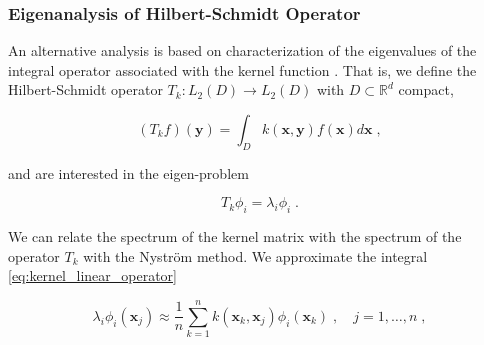 \documentclass{article}
\newcommand{\vect}[1]{\boldsymbol{\mathbf{#1}}}
\newcommand{\R}{\mathbb R}
\DeclareMathOperator{\E}{\mathbb{E}}
\newtheorem{lemma}[theorem]{Lemma}
\begin{document}

\subsubsection{Eigenanalysis of Hilbert-Schmidt Operator} 

An alternative analysis is based on characterization of the eigenvalues of the integral operator associated with the kernel function \cite{banerjee_parallel_2013, pan_learning_2011, bach_kernel_2002}. That is, we define the Hilbert-Schmidt operator $T_k : L_2(D) \to L_2(D)$ with $D \subset \R^d$ compact,

\begin{equation} \label{eq:kernel_linear_operator}
    (T_k f)(\vect y) = \int_{D} k(\vect x, \vect y) f(\vect x)  d\vect x  \; ,%
\end{equation}

and are interested in the eigen-problem

\begin{equation*}
    T_k \phi_i = \lambda_i \phi_i \; .
\end{equation*}

We can relate the spectrum of the kernel matrix with the spectrum of the operator $T_k$ with the Nyström method. We approximate the integral  \eqref{eq:kernel_linear_operator}

\begin{equation} \label{eq:nystrom}
    \lambda_i \phi_i(\vect x_j) \approx \frac{1}{n} \sum_{k=1}^n k(\vect x_k, \vect x_j) \phi_i(\vect x_k) \; , 
    \quad j = 1, \ldots, n \; ,
\end{equation}
\end{document}
